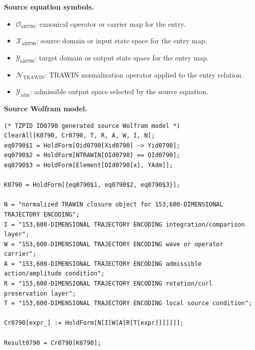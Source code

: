 \begin{minipage}[t]{0.49\linewidth}
\begingroup
\small
\raggedright
\textbf{Source equation symbols.}\par
\begin{itemize}[leftmargin=1.35em,itemsep=1pt,topsep=1pt,parsep=0pt]
    \item $\mathcal{O}_{\mathrm{id0790}}$: canonical operator or carrier map for the entry.
    \item $\mathcal{X}_{\mathrm{id0790}}$: source domain or input state space for the entry map.
    \item $\mathcal{Y}_{\mathrm{id0790}}$: target domain or output state space for the entry map.
    \item $\mathcal{N}_{\mathrm{TRAWIN}}$: TRAWIN normalization operator applied to the entry relation.
    \item $\mathcal{Y}_{\mathrm{adm}}$: admissible output space selected by the source equation.
\end{itemize}
\endgroup
\end{minipage}\hfill
\begin{minipage}[t]{0.47\linewidth}
\begingroup
\scriptsize
\raggedright
\textbf{Source Wolfram model.}\par
\begin{Verbatim}[fontsize=\tiny,breaklines=true,breakanywhere=true]
(* TZPID ID0790 generated source Wolfram model *)
ClearAll[K0790, Cr0790, T, R, A, W, I, N];
eq0790$1 = HoldForm[Oid0790[Xid0790] -> Yid0790];
eq0790$2 = HoldForm[NTRAWIN[OId0790] == OId0790];
eq0790$3 = HoldForm[Element[OId0790[x], YAdm]];

K0790 = HoldForm[{eq0790$1, eq0790$2, eq0790$3}];

N = "normalized TRAWIN closure object for 153,600-DIMENSIONAL TRAJECTORY ENCODING";
I = "153,600-DIMENSIONAL TRAJECTORY ENCODING integration/comparison layer";
W = "153,600-DIMENSIONAL TRAJECTORY ENCODING wave or operator carrier";
A = "153,600-DIMENSIONAL TRAJECTORY ENCODING admissible action/amplitude condition";
R = "153,600-DIMENSIONAL TRAJECTORY ENCODING rotation/curl preservation layer";
T = "153,600-DIMENSIONAL TRAJECTORY ENCODING local source condition";

Cr0790[expr_] := HoldForm[N[I[W[A[R[T[expr]]]]]]];

Result0790 = Cr0790[K0790];
\end{Verbatim}
\endgroup
\end{minipage}

